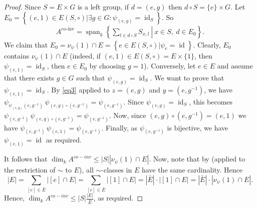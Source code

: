 \documentclass[a4paper,10pt]{amsart}
\theoremstyle{definition}
\theoremstyle{remark}
\DeclareMathOperator{\id}{id}
\begin{document}
\begin{proof}
Since $S=E\times G$ is a left group, if $d=(e,g)$ then $d\circ S=\{e\}\times G$. Let $E_0=\left\{\left. (e,1) \in E(S,\circ) \right| \exists g \in G \colon \psi_{(e,g)}=\id_S\right\}$. So 
\begin{align*}
    A^{\mathrm{co\mbox{-}inv}}
    =\operatorname{span}_{k}\left\{
    \left.\sum_{l \in d\circ S} S_{x,l}\ \right|\ x \in S,\ d \in E_0
    \right\}.
\end{align*}
We claim that $E_0=\nu_{\psi}(1)\cap E=\left\{\left.e \in E(S,\circ)\right|\psi_{e}=\id\right\}$. Clearly, $E_0$ contains $\nu_{\psi}(1)\cap E$ (indeed, if $(e,1)\in E(S,\circ)=E\times \{1\}$, then $\psi_(e,1)=\id_S$, then $e\in E_0$ by choosing $g=1$). Conversely, let $e\in E$ and assume that there exists $g\in G$ such that $\psi_{(e,g)}=\id_S$.
We want to prove that $\psi_{(e,1)}=\id_S$. By \eqref{eq3} applied to $z=(e,g)$ and $y=(e,g^{-1})$, we have $\psi_{\psi_{(e,g)}(e,g^{-1})}\,\psi_{(e,g)\circ (e,g^{-1})}=\psi_{(e,g^{-1})}$. Since $\psi_{(e,g)}=\id_S$, this becomes $\psi_{(e,g^{-1})}\,\psi_{(e,g)\circ (e,g^{-1})}=\psi_{(e,g^{-1})}$. Now, since $(e,g)\circ (e,g^{-1})=(e,1)$ we have $\psi_{(e,g^{-1})}\,\psi_{(e,1)}=\psi_{(e,g^{-1})}$. Finally, as $\psi_{(e,g^{-1})}$ is bijective, we have $\psi_{(e,1)}=\id$ as required. 

It follows that $\dim_k A^{co-inv}\leq |S||\nu_\psi(1)\cap E|$. Now, note that by  (applied to the restriction of $\sim$ to $E$), all $\sim$-classes in $E$ have the same cardinality. Hence
$$|E|
=\sum_{[e]\in \bar{E}} |[e]\cap E|
=\sum_{[e]\in \bar{E}} |[1]\cap E|
=|\bar{E}|\cdot |[1]\cap E|
=|\bar E|\cdot |\nu_\psi(1)\cap E|.$$
Hence, $\dim_k A^{co-inv} \leq |S|\frac{|E|}{\bar{E}}$, as required. 
\end{proof}
\end{document}
